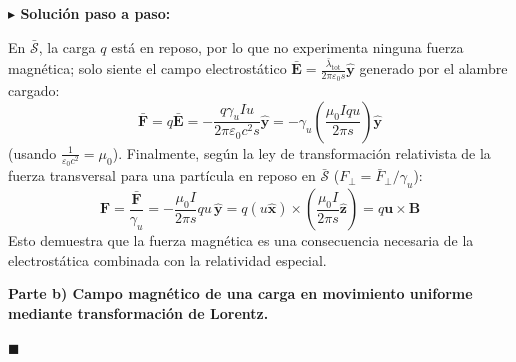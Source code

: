 \documentclass[11pt,a4paper]{book}
\newenvironment{solucion}{%
    \par\medskip\noindent\textbf{\color{blue!65!black}\Large $\blacktriangleright$ Solución paso a paso:}\par\medskip
}{%
    \hfill$\blacksquare$\par\bigskip
}
\newcommand{\xhat}{\hat{\bm{x}}}
\newcommand{\yhat}{\hat{\bm{y}}}
\newcommand{\zhat}{\hat{\bm{z}}}
\newcommand{\Evec}{\bm{E}}
\newcommand{\Bvec}{\bm{B}}
\begin{document}
\begin{solucion}
En $\bar{\mathcal{S}}$, la carga $q$ está en reposo, por lo que no experimenta ninguna fuerza magnética; solo siente el campo electrostático $\bar{\Evec} = \frac{\bar{\lambda}_{\text{tot}}}{2\pi\varepsilon_0 s}\yhat$ generado por el alambre cargado:
\begin{equation}
    \bar{\bm{F}} = q\bar{\Evec} = -\frac{q \gamma_u I u}{2\pi\varepsilon_0 c^2 s}\yhat = -\gamma_u \left(\frac{\mu_0 I q u}{2\pi s}\right)\yhat
\end{equation}
(usando $\frac{1}{\varepsilon_0 c^2} = \mu_0$). Finalmente, según la ley de transformación relativista de la fuerza transversal para una partícula en reposo en $\bar{\mathcal{S}}$ ($F_\perp = \bar{F}_\perp / \gamma_u$):
\begin{equation}
    \bm{F} = \frac{\bar{\bm{F}}}{\gamma_u} = -\frac{\mu_0 I}{2\pi s} q u \,\yhat = q(u\xhat) \times \left(\frac{\mu_0 I}{2\pi s}\zhat\right) = q \bm{u} \times \Bvec
\end{equation}
Esto demuestra que la fuerza magnética es una consecuencia necesaria de la electrostática combinada con la relatividad especial.

\medskip
\textbf{Parte b) Campo magnético de una carga en movimiento uniforme mediante transformación de Lorentz.}


\end{solucion}
\end{document}
